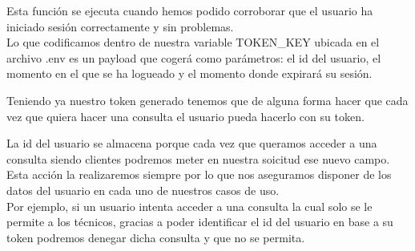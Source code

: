Esta función se ejecuta cuando hemos podido corroborar que el usuario ha iniciado sesión correctamente y sin problemas.
\\Lo que codificamos dentro de nuestra variable TOKEN\_KEY ubicada en el archivo .env es un payload que cogerá como parámetros: el id del usuario, el momento en el que se ha logueado y el momento donde expirará su sesión.

Teniendo ya nuestro token generado tenemos que de alguna forma hacer que cada vez que quiera hacer una consulta el usuario pueda hacerlo con su token.

\begin{tcolorbox}
    [colback=green!5!white,colframe=green!75!black,fonttitle=\bfseries,title=¿Por qué almacenamos la id del usuario en nuestro payload?]
    La id del usuario se almacena porque cada vez que queramos acceder a una consulta siendo clientes podremos meter en nuestra soicitud ese nuevo campo. Esta acción la realizaremos siempre por lo que nos aseguramos disponer de los datos del usuario en cada uno de nuestros casos de uso.
    \\Por ejemplo, si un usuario intenta acceder a una consulta la cual solo se le permite a los técnicos, gracias a poder identificar el id del usuario en base a su token podremos denegar dicha consulta y que no se permita.
\end{tcolorbox}

